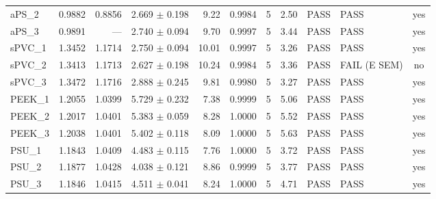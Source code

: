 \begin{longtable}{l r r r r r r r l l c}
aPS\_2 & 0.9882 & 0.8856 & 2.669 $\pm$ 0.198 & 9.22 & 0.9984 & 5 & 2.50 & PASS & PASS & yes \\
aPS\_3 & 0.9891 & --- & 2.740 $\pm$ 0.094 & 9.70 & 0.9997 & 5 & 3.44 & PASS & PASS & yes \\
sPVC\_1 & 1.3452 & 1.1714 & 2.750 $\pm$ 0.094 & 10.01 & 0.9997 & 5 & 3.26 & PASS & PASS & yes \\
sPVC\_2 & 1.3413 & 1.1713 & 2.627 $\pm$ 0.198 & 10.24 & 0.9984 & 5 & 3.36 & PASS & FAIL (E SEM) & no \\
sPVC\_3 & 1.3472 & 1.1716 & 2.888 $\pm$ 0.245 & 9.81 & 0.9980 & 5 & 3.27 & PASS & PASS & yes \\
PEEK\_1 & 1.2055 & 1.0399 & 5.729 $\pm$ 0.232 & 7.38 & 0.9999 & 5 & 5.06 & PASS & PASS & yes \\
PEEK\_2 & 1.2017 & 1.0401 & 5.383 $\pm$ 0.059 & 8.28 & 1.0000 & 5 & 5.52 & PASS & PASS & yes \\
PEEK\_3 & 1.2038 & 1.0401 & 5.402 $\pm$ 0.118 & 8.09 & 1.0000 & 5 & 5.63 & PASS & PASS & yes \\
PSU\_1 & 1.1843 & 1.0409 & 4.483 $\pm$ 0.115 & 7.76 & 1.0000 & 5 & 3.72 & PASS & PASS & yes \\
PSU\_2 & 1.1877 & 1.0428 & 4.038 $\pm$ 0.121 & 8.86 & 0.9999 & 5 & 3.77 & PASS & PASS & yes \\
PSU\_3 & 1.1846 & 1.0415 & 4.511 $\pm$ 0.041 & 8.24 & 1.0000 & 5 & 4.71 & PASS & PASS & yes \\
\end{longtable}
\normalsize
